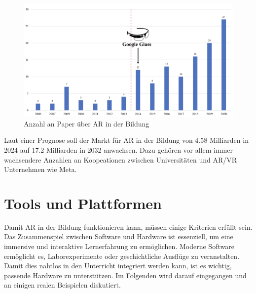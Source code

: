 \documentclass[conference]{IEEEtran}
\begin{document}
\begin{figure}[htbp]
    \centerline{\includegraphics[scale=0.2]{img/entwicklung.png}}
    \caption{Anzahl an Paper über AR in der Bildung \cite{b15}}
    \label{fig1}
\end{figure}

Laut einer Prognose soll der Markt für AR in der Bildung von 4.58 Milliarden in 2024 auf 17.2 Milliarden in 2032 anwachsen. \cite{b15} Dazu gehören vor allem immer wachsendere Anzahlen an Koopeationen zwischen
Universitäten und AR/VR Unternehmen wie Meta. 

\section{Tools und Plattformen}\label{AA}
Damit AR in der Bildung funktionieren kann, müssen einige Kriterien erfüllt sein. Das Zusammenspiel
zwischen Software und Hardware ist essenziell, um eine immersive und interaktive Lernerfahrung
zu ermöglichen. \cite{b13} Moderne Software ermöglicht es, Laborexperimente oder geschichtliche Ausflüge
zu veranstalten. Damit dies nahtlos in den Unterricht integriert werden kann, ist es wichtig, passende Hardware zu unterstützen.
Im Folgenden wird darauf eingegangen und an einigen realen Beispielen diskutiert.
\end{document}
